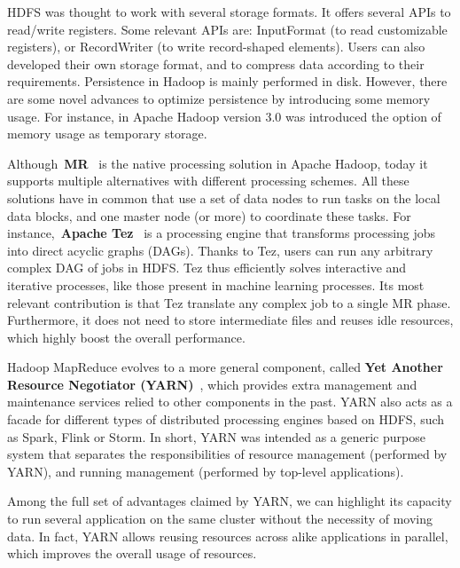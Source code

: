 \documentclass[3p,review]{elsarticle}
\begin{document}
	
	
	HDFS was thought to work with several storage formats. It offers several APIs to read/write registers. Some relevant APIs are: InputFormat (to read customizable registers), or RecordWriter (to write record-shaped elements). Users can also developed their own storage format, and to compress data according to their requirements. Persistence in Hadoop is mainly performed in disk. However, there are some novel advances to optimize persistence by introducing some memory usage. For instance, in Apache Hadoop version 3.0 was introduced the option of memory usage as temporary storage.
	
	Although~\textbf{MR}~\cite{dean04} is the native processing solution in Apache Hadoop, today it supports multiple alternatives with different processing schemes. All these solutions have in common that use a set of data nodes to run tasks on the local data blocks, and one master node (or more) to coordinate these tasks. For instance,~\textbf{Apache Tez}~\cite{tez} is a processing engine that transforms processing jobs into direct acyclic graphs (DAGs). Thanks to Tez, users can run any arbitrary complex DAG of jobs in HDFS. Tez thus efficiently solves interactive and iterative processes, like those present in machine learning processes. Its most relevant contribution is that Tez translate any complex job to a single MR phase. Furthermore, it does not need to store intermediate files and reuses idle resources, which highly boost the overall performance.
	
	Hadoop MapReduce evolves to a more general component, called \textbf{Yet Another Resource Negotiator (YARN)}~\cite{yarn}, which provides extra management and maintenance services relied to other components in the past. YARN also acts as a facade for different types of distributed processing engines based on HDFS, such as Spark, Flink or Storm. In short, YARN was intended as a generic purpose system that separates the responsibilities of resource management (performed by YARN), and running management (performed by top-level applications).
	
	Among the full set of advantages claimed by YARN, we can highlight its capacity to run several application on the same cluster without the necessity of moving data. In fact, YARN allows reusing resources across alike applications in parallel, which improves the overall usage of resources.
	
\end{document}
